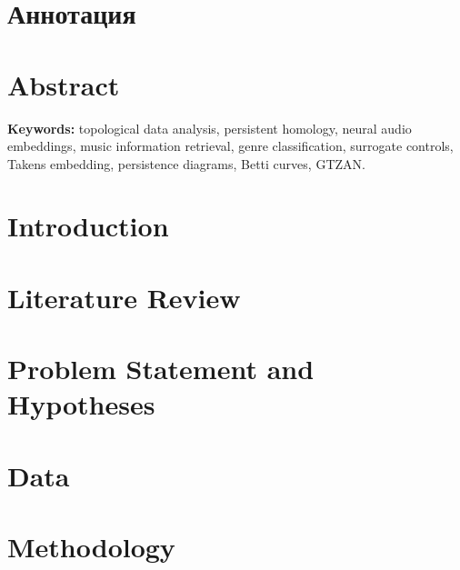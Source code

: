 \documentclass[12pt,a4paper]{article}
\begin{document}

\thispagestyle{empty}

\clearpage
\tableofcontents

\clearpage
\section*{Аннотация}


\section*{Abstract}


\bigskip
\noindent\textbf{Keywords:} topological data analysis, persistent homology, neural audio embeddings, music information retrieval, genre classification, surrogate controls, Takens embedding, persistence diagrams, Betti curves, GTZAN.

\clearpage
\section{Introduction}\label{sec:intro}


\section{Literature Review}\label{sec:litreview}


\section{Problem Statement and Hypotheses}\label{sec:hypotheses}


\section{Data}\label{sec:data}


\section{Methodology}\label{sec:methodology}

\end{document}
